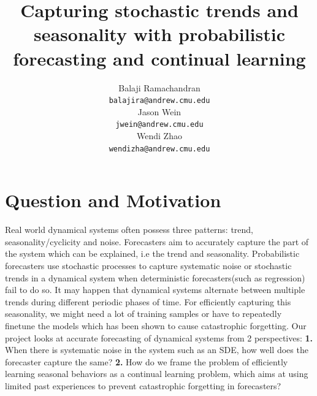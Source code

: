 \documentclass{article}
\title{Capturing stochastic trends and seasonality with probabilistic forecasting and continual learning}
\author{%
  Balaji Ramachandran\\
  \texttt{balajira@andrew.cmu.edu} \\
  \And
  Jason Wein \\
  \texttt{jwein@andrew.cmu.edu} \\
  \And
  Wendi Zhao \\
  \texttt{wendizha@andrew.cmu.edu} \\
}
\begin{document}
\maketitle





\section{Question and Motivation}

Real world dynamical systems often possess three patterns: trend, seasonality/cyclicity and noise. Forecasters aim to accurately capture the part of the system which can be explained, i.e the trend and seasonality. Probabilistic forecasters use stochastic processes to capture systematic noise or stochastic trends in a dynamical system when deterministic forecasters(such as regression) fail to do so. It may happen that dynamical systems alternate between multiple trends during different periodic phases of time. For efficiently capturing this seasonality, we might need a lot of training samples or have to repeatedly finetune the models which has been shown to cause catastrophic forgetting. Our project looks at accurate forecasting of dynamical systems from 2 perspectives:
\textbf{1.} When there is systematic noise in the system such as an SDE, how well does the forecaster capture the same?
\textbf{2.} How do we frame the problem of efficiently learning seasonal behaviors as a continual learning problem, which aims at using limited past experiences to prevent catastrophic forgetting in forecasters?
\end{document}
